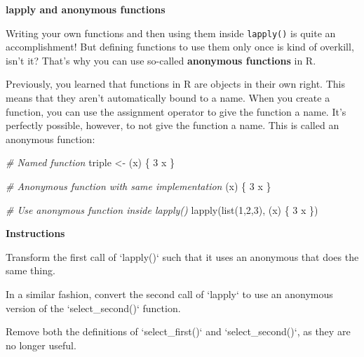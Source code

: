 \documentclass[]{article}
\newcommand{\hlnum}[1]{\textcolor[rgb]{0.816,0.125,0.439}{#1}}%
\newcommand{\hlstr}[1]{\textcolor[rgb]{0.251,0.627,0.251}{#1}}%
\newcommand{\hlcom}[1]{\textcolor[rgb]{0.502,0.502,0.502}{\textit{#1}}}%
\newcommand{\hlstd}[1]{\textcolor[rgb]{0.251,0.251,0.251}{#1}}%
\newcommand{\hlkwc}[1]{\textcolor[rgb]{0.251,0.251,0.251}{#1}}%
\newcommand{\hlkwd}[1]{\textcolor[rgb]{0.878,0.439,0.125}{#1}}%
\newenvironment{Shaded}{\begin{myshaded}}{\end{myshaded}}
\newcommand{\KeywordTok}[1]{\hlkwd{#1}}
\newcommand{\DataTypeTok}[1]{\hlkwc{#1}}
\newcommand{\DecValTok}[1]{\hlnum{#1}}
\newcommand{\StringTok}[1]{\hlstr{#1}}
\newcommand{\CommentTok}[1]{\hlcom{#1}}
\newcommand{\NormalTok}[1]{\hlstd{#1}}
\begin{document}
\textbf{lapply and anonymous functions}

Writing your own functions and then using them inside \texttt{lapply()}
is quite an accomplishment! But defining functions to use them only once
is kind of overkill, isn't it? That's why you can use so-called
\textbf{anonymous functions} in R.

Previously, you learned that functions in R are objects in their own
right. This means that they aren't automatically bound to a name. When
you create a function, you can use the assignment operator to give the
function a name. It's perfectly possible, however, to not give the
function a name. This is called an anonymous function:

\begin{Shaded}
\begin{Highlighting}[]
\CommentTok{# Named function}
\NormalTok{triple <-}\StringTok{ }\NormalTok{(x) \{ }\DecValTok{3} \OperatorTok{*}\StringTok{ }\NormalTok{x \}}

\CommentTok{# Anonymous function with same implementation}
\NormalTok{(x) \{ }\DecValTok{3} \OperatorTok{*}\StringTok{ }\NormalTok{x \}}

\CommentTok{# Use anonymous function inside lapply()}
\KeywordTok{lapply}\NormalTok{(}\KeywordTok{list}\NormalTok{(}\DecValTok{1}\NormalTok{,}\DecValTok{2}\NormalTok{,}\DecValTok{3}\NormalTok{), }\NormalTok{(x) \{ }\DecValTok{3} \OperatorTok{*}\StringTok{ }\NormalTok{x \})}
\end{Highlighting}
\end{Shaded}

\textbf{Instructions}

\begin{Shaded}
\begin{Highlighting}[]

\OperatorTok{*}\StringTok{ }\NormalTok{Transform the first call of }\StringTok{`}\DataTypeTok{lapply()}\StringTok{`}\NormalTok{ such that it uses an anonymous }\NormalTok{ that does the same thing.}

\OperatorTok{*}\StringTok{ }\NormalTok{In a similar fashion, convert the second call of }\StringTok{`}\DataTypeTok{lapply}\StringTok{`}\NormalTok{ to use an anonymous version of the }\StringTok{`}\DataTypeTok{select_second()}\StringTok{`}\NormalTok{ function.}

\OperatorTok{*}\StringTok{ }\NormalTok{Remove both the definitions of }\StringTok{`}\DataTypeTok{select_first()}\StringTok{`}\NormalTok{ and }\StringTok{`}\DataTypeTok{select_second()}\StringTok{`}\NormalTok{, as they are no longer useful.}
\end{Highlighting}
\end{Shaded}
\end{document}
